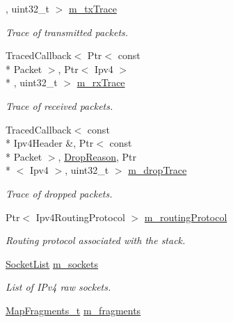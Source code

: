 \begin{DoxyCompactItemize}
, uint32\-\_\-t $>$ \hyperlink{classns3_1_1Ipv4RouterL3Protocol_a4d2088884f46909d02a7d0afc97df51f}{m\-\_\-tx\-Trace}
\begin{DoxyCompactList}\small\item\em Trace of transmitted packets. \end{DoxyCompactList}\item 
Traced\-Callback$<$ Ptr$<$ const \\*
Packet $>$, Ptr$<$ Ipv4 $>$\\*
, uint32\-\_\-t $>$ \hyperlink{classns3_1_1Ipv4RouterL3Protocol_a8f30202038799f4581a8339378012995}{m\-\_\-rx\-Trace}
\begin{DoxyCompactList}\small\item\em Trace of received packets. \end{DoxyCompactList}\item 
Traced\-Callback$<$ const \\*
Ipv4\-Header \&, Ptr$<$ const \\*
Packet $>$, \hyperlink{classns3_1_1Ipv4RouterL3Protocol_a050d08aa42fe2c3f9c133a263e121fcd}{Drop\-Reason}, Ptr\\*
$<$ Ipv4 $>$, uint32\-\_\-t $>$ \hyperlink{classns3_1_1Ipv4RouterL3Protocol_ab598d069af6668c2d60e77965463f75e}{m\-\_\-drop\-Trace}
\begin{DoxyCompactList}\small\item\em Trace of dropped packets. \end{DoxyCompactList}\item 
Ptr$<$ Ipv4\-Routing\-Protocol $>$ \hyperlink{classns3_1_1Ipv4RouterL3Protocol_a06835e8c56b7c1ab3efce79e6fb6a10a}{m\-\_\-routing\-Protocol}
\begin{DoxyCompactList}\small\item\em Routing protocol associated with the stack. \end{DoxyCompactList}\item 
\hyperlink{classns3_1_1Ipv4RouterL3Protocol_aeaeda330ab6a6f6d7cf4392024f4dc8e}{Socket\-List} \hyperlink{classns3_1_1Ipv4RouterL3Protocol_aa0d8fc6efa8a5785ec656e2ecb5c2489}{m\-\_\-sockets}
\begin{DoxyCompactList}\small\item\em List of I\-Pv4 raw sockets. \end{DoxyCompactList}\item 
\hyperlink{classns3_1_1Ipv4RouterL3Protocol_ad13f1d7a6fde1bccea2a986f095bbf9e}{Map\-Fragments\-\_\-t} \hyperlink{classns3_1_1Ipv4RouterL3Protocol_a60a936fabd02114e24cf81433659e575}{m\-\_\-fragments}

\end{DoxyCompactItemize}
